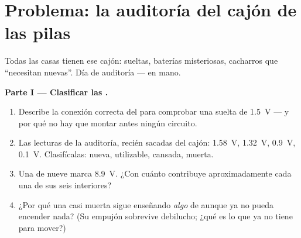 \section{Problema: la auditoría del cajón de las pilas}

\begin{problem}\label{pb:g8:voltage-voltmeter:1}
Todas las casas tienen ese cajón:  sueltas, baterías misteriosas,
cacharros que ``necesitan  nuevas''. Día de auditoría ---
 en mano.

\medskip\noindent\textbf{Parte I --- Clasificar las .}
\begin{enumerate}
  \item Describe la conexión correcta del  para
        comprobar una  suelta de \qty{1.5}{V} --- y por qué no
        hay que montar antes ningún circuito.
  \item Las lecturas de la auditoría, recién sacadas del cajón:
        \qty{1.58}{V}, \qty{1.32}{V}, \qty{0.9}{V}, \qty{0.1}{V}.
        Clasifícalas: nueva, utilizable, cansada, muerta.
  \item Una  de nueve  marca \qty{8.9}{V}.
        ¿Con cuánto contribuye aproximadamente cada una de sus seis
         interiores?
  \item ¿Por qué una  casi muerta sigue enseñando \emph{algo} de
         aunque ya no pueda encender nada? (Su
        empujón sobrevive debilucho; ¿qué es lo que ya no tiene
         para mover?)
\end{enumerate}


\end{problem}
